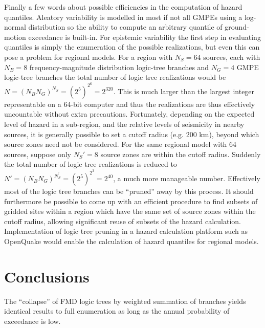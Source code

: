 \documentclass{article}
\begin{document}
Finally a few words about possible efficiencies in the computation of hazard quantiles.
Aleatory variability is modelled in most if not all GMPEs using a log-normal distribution so the ability to compute an arbitrary quantile of ground-motion exceedance is built-in. 
For epistemic variability the first step in evaluating quantiles is simply the enumeration of the possible realizations, but even this can pose a problem for regional models.
For a region with $N_S = 64$ sources, each with $N_B = 8$ frequency-magnitude distribution logic-tree branches and $N_G = 4$ GMPE logic-tree branches the total number of logic tree realizations would be $N = (N_B N_G)^{N_S} = (2^5)^{2^6} = 2^{320}$. 
This is much larger than the largest integer representable on a 64-bit computer and thus the realizations are thus effectively uncountable without extra precautions.
Fortunately, depending on the expected level of hazard in a sub-region, and the relative levels of seismicity in nearby sources, it is generally possible to set a cutoff radius (e.g. 200 km), beyond which source zones need not be considered.
For the same regional model with 64 sources, suppose only $N_S'= 8$ source zones are within the cutoff radius. 
Suddenly the total number of logic tree realizations is reduced to $N' = (N_B N_G)^{N_S^\prime} = (2^5)^{2^3} = 2^{40}$, a much more manageable number.
Effectively most of the logic tree branches can be ``pruned'' away by this process.
It should furthermore be possible to come up with an efficient procedure to find subsets of gridded sites within a region which have the same set of source zones within the cutoff radius, allowing significant reuse of subsets of the hazard calculation.
Implementation of logic tree pruning in a hazard calculation platform such as OpenQuake would enable the calculation of hazard quantiles for regional models.

\section{Conclusions}

The ``collapse'' of FMD logic trees by weighted summation of branches yields identical results to full enumeration as long as the annual probability of exceedance is low.




\end{document}
